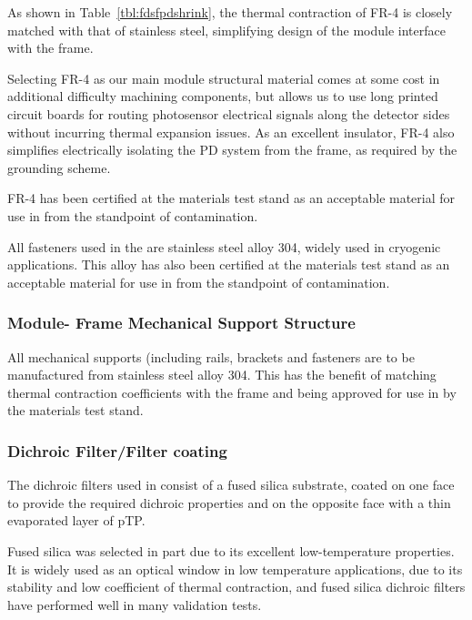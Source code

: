 As shown in Table~\ref{tbl:fdsfpdshrink}, the thermal contraction of FR-4 is closely matched with that of stainless steel, simplifying design of the module interface with the  frame.

Selecting FR-4 as our main module structural material comes at some cost in additional difficulty machining components, but allows us to use long printed circuit boards for routing photosensor electrical signals along the detector sides without incurring thermal expansion issues.  As an excellent insulator, FR-4 also simplifies electrically isolating the PD system from the  frame, as required by the  grounding scheme.

FR-4 has been certified at the  materials test stand as an acceptable material for use in  from the standpoint of  contamination.

All fasteners used in the  are stainless steel alloy 304, widely used in cryogenic applications.  This alloy has also been certified at the  materials test stand as an acceptable material for use in  from the standpoint of  contamination.

\subsubsection{ Module- Frame Mechanical Support Structure}

All  mechanical supports (including rails, brackets and fasteners are to be manufactured from stainless steel alloy 304.  This has the benefit of matching thermal contraction coefficients with the  frame and being approved for use in  by the materials test stand.

\subsubsection{Dichroic Filter/Filter coating}

The dichroic filters used in  consist of a fused silica substrate, coated on one face to provide the required dichroic properties and on the opposite face with a thin evaporated layer of pTP.

Fused silica was selected in part due to its excellent low-temperature properties.  It is widely used as an optical window in low temperature applications, due to its stability and low coefficient of thermal contraction, and fused silica dichroic filters have performed well in many  validation tests.

